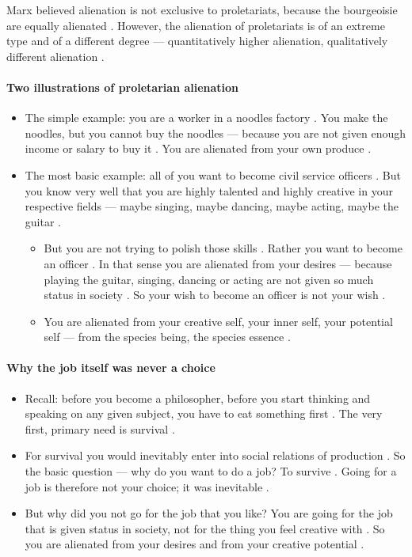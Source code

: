 \begin{CriticalPoint}
Marx believed alienation is not exclusive to proletariats, because the bourgeoisie are equally alienated . However, the alienation of proletariats is of an extreme type and of a different degree --- quantitatively higher alienation, qualitatively different alienation .
\end{CriticalPoint}

\paragraph{Two illustrations of proletarian alienation}
\begin{itemize}
    \item The simple example: you are a worker in a noodles factory . You make the noodles, but you cannot buy the noodles --- because you are not given enough income or salary to buy it . You are alienated from your own produce .
    \item The most basic example: all of you want to become civil service officers . But you know very well that you are highly talented and highly creative in your respective fields --- maybe singing, maybe dancing, maybe acting, maybe the guitar .
    \begin{itemize}
        \item But you are not trying to polish those skills . Rather you want to become an officer . In that sense you are alienated from your desires --- because playing the guitar, singing, dancing or acting are not given so much status in society . So your wish to become an officer is not your wish .
        \item You are alienated from your creative self, your inner self, your potential self --- from the species being, the species essence .
    \end{itemize}
\end{itemize}

\paragraph{Why the job itself was never a choice}
\begin{itemize}
    \item Recall: before you become a philosopher, before you start thinking and speaking on any given subject, you have to eat something first . The very first, primary need is survival .
    \item For survival you would inevitably enter into social relations of production . So the basic question --- why do you want to do a job? To survive . Going for a job is therefore not your choice; it was inevitable .
    \item But why did you not go for the job that you like? You are going for the job that is given status in society, not for the thing you feel creative with . So you are alienated from your desires and from your creative potential .
\end{itemize}

